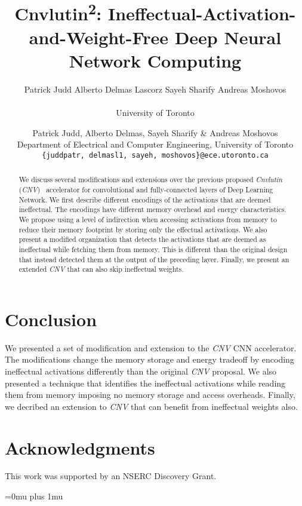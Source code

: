 \documentclass[letterpaper,conference]{IEEEtran}
\newcommand{\ZF}{\textit{CNV}\xspace}
\begin{document}
%
%
\title{Cnvlutin\textsuperscript{2}: Ineffectual-Activation-and-Weight-Free Deep Neural Network Computing}
%
%
%
\author{Patrick Judd \quad Alberto Delmas Lascorz \quad Sayeh Sharify \quad Andreas Moshovos\\ 
\\
  University of Toronto}

\author{
Patrick Judd,
Alberto Delmas,
Sayeh Sharify
\& Andreas Moshovos\\
Department of Electrical and Computer Engineering, University of Toronto\\ 
\texttt{\{juddpatr, delmasl1, sayeh, moshovos\}@ece.utoronto.ca} \\ 
}

%

\maketitle
\thispagestyle{firstpage}

\pagestyle{plain}

\begin{abstract}
%
We discuss several modifications and extensions over the previous proposed \textit{Cnvlutin}
(\ZF) \ accelerator for convolutional and fully-connected layers of Deep Learning Network. 
We first describe different encodings of the activations that are deemed ineffectual.  The encodings have different memory overhead and energy characteristics.  We propose using a level of indirection when accessing activations from memory to reduce their memory footprint by storing only the effectual activations. We also present a modified organization that detects the activations that are deemed as ineffectual while fetching them from memory. This is different than the original design that instead detected them at the output of the preceding layer. Finally, we 
present an extended \ZF that can also skip ineffectual weights.



%

\end{abstract}



%
%

%
%

%

\section{Conclusion}
\label{sec:theend}

%

We presented a set of modification and extension to the \ZF CNN accelerator. The modifications change the memory storage and energy tradeoff by encoding ineffectual activations differently than the original \ZF proposal. We also presented a technique that identifies the ineffectual activations while reading them from memory imposing no memory storage and access overheads. Finally, we decribed an extension to \ZF that can benefit from ineffectual weights also.
%

%
 
%

%

%

%
%
%
%
%
%
%
\section*{Acknowledgments} This work was supported by an NSERC Discovery Grant.

%

%
\Urlmuskip=0mu plus 1mu\relax


%
\end{document}
